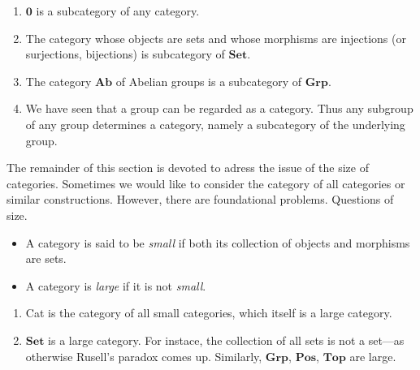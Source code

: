 \begin{example}
\begin{enumerate}[label=(\alph*)]
    \item \(\mathbf{0}\) is a subcategory of any category.

    \item The category whose objects are sets and whose morphisms are injections (or surjections, bijections)   is subcategory of \(\mathbf{Set}\).    
    \item The category \(\mathbf{Ab}\) of Abelian groups is a subcategory of \(\mathbf{Grp}\).
    \item We have seen that a group can be regarded as a category. Thus any subgroup of any group determines a category, namely a subcategory of the underlying group.

\end{enumerate}
\end{example}

The remainder of this section is devoted to adress the issue of the size of categories.
Sometimes we would like to consider the category of all categories
or similar constructions. However, 
there are foundational problems.
Questions of size.

\begin{definition}
\begin{itemize}[left=0pt]
    \item A category is said to be \textit{small} if both its collection of objects and morphisms are sets.
    \item A category is  \textit{large} if it is not \textit{small}.
\end{itemize}    
\end{definition}

\begin{example}
\begin{enumerate}[label=(\alph*)]
    \item Cat is the category of all small categories, which itself is a large category.
    \item \(\mathbf{Set}\) is a large category. For instace, the collection of all sets is not a set---as otherwise Rusell's paradox comes up. Similarly, \(\mathbf{Grp}\), \(\mathbf{Pos}\), \(\mathbf{Top}\) are large.
\end{enumerate}
\end{example}



